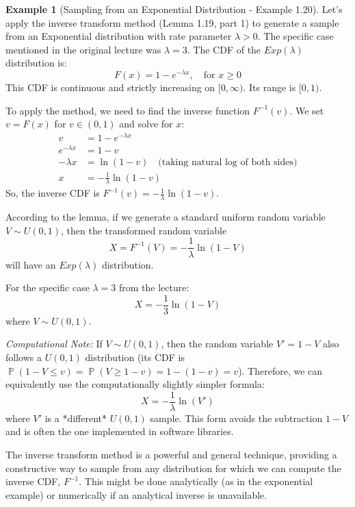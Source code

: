 \documentclass[11pt]{article}
\theoremstyle{definition}
\newtheorem{example}[theorem]{Example}
\theoremstyle{remark}
\DeclareMathOperator{\Prob}{\mathbb{P}} %
\begin{document}
\begin{example}[Sampling from an Exponential Distribution - Example 1.20]
Let's apply the inverse transform method (Lemma 1.19, part 1) to generate a sample from an Exponential distribution with rate parameter $\lambda > 0$. The specific case mentioned in the original lecture was $\lambda = 3$.
The CDF of the $Exp(\lambda)$ distribution is:
\[ F(x) = 1 - e^{-\lambda x}, \quad \text{for } x \ge 0 \]
This CDF is continuous and strictly increasing on $[0, \infty)$. Its range is $[0, 1)$.

To apply the method, we need to find the inverse function $F^{-1}(v)$. We set $v = F(x)$ for $v \in (0, 1)$ and solve for $x$:
\begin{align*} v &= 1 - e^{-\lambda x} \\ e^{-\lambda x} &= 1 - v \\ -\lambda x &= \ln(1 - v) \quad \text{(taking natural log of both sides)} \\ x &= -\frac{1}{\lambda} \ln(1 - v) \end{align*}
So, the inverse CDF is $F^{-1}(v) = -\frac{1}{\lambda} \ln(1 - v)$.

According to the lemma, if we generate a standard uniform random variable $V \sim U(0, 1)$, then the transformed random variable
\[ X = F^{-1}(V) = -\frac{1}{\lambda} \ln(1 - V) \]
will have an $Exp(\lambda)$ distribution.

For the specific case $\lambda = 3$ from the lecture:
\[ X = -\frac{1}{3} \ln(1 - V) \]
where $V \sim U(0, 1)$.

\textit{Computational Note:} If $V \sim U(0, 1)$, then the random variable $V' = 1 - V$ also follows a $U(0, 1)$ distribution (its CDF is $\Prob(1-V \le v) = \Prob(V \ge 1-v) = 1 - (1-v) = v$). Therefore, we can equivalently use the computationally slightly simpler formula:
\[ X = -\frac{1}{\lambda} \ln(V') \]
where $V'$ is a *different* $U(0, 1)$ sample. This form avoids the subtraction $1-V$ and is often the one implemented in software libraries.
\end{example}

The inverse transform method is a powerful and general technique, providing a constructive way to sample from any distribution for which we can compute the inverse CDF, $F^{-1}$. This might be done analytically (as in the exponential example) or numerically if an analytical inverse is unavailable.

\end{document}
